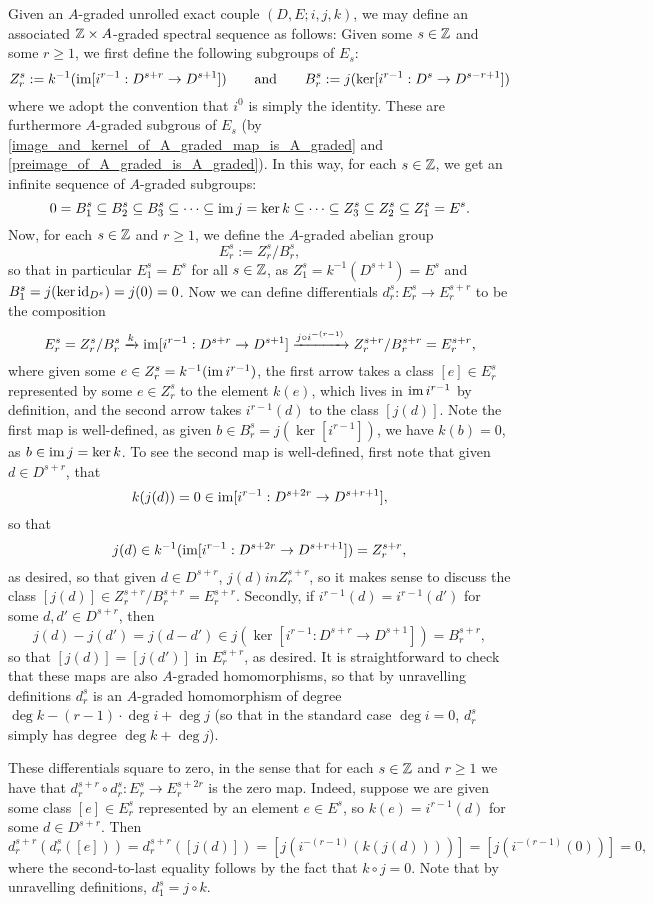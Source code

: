 \documentclass[../main.tex]{subfiles}
\begin{document}
Given an $A$-graded unrolled exact couple $(D,E;i,j,k)$, we may define an associated $\mathbb{Z}\times A$-graded spectral sequence as follows: Given some $s\in\mathbb{Z}$ and some $r\geq1$, we first define the following subgroups of $E_s$:
\[Z_r^s:= k^{-1}(\operatorname{im}[i^{r-1}:D^{s+r}\to D^{s+1}])\qquad\text{and}\qquad B_r^s:=j(\ker[i^{r-1}:D^s\to D^{s-r+1}])\]
where we adopt the convention that $i^{0}$ is simply the identity. These are furthermore $A$-graded subgrous of $E_s$ (by \autoref{image_and_kernel_of_A_graded_map_is_A_graded} and \autoref{preimage_of_A_graded_is_A_graded}). In this way, for each $s\in\mathbb{Z}$, we get an infinite sequence of $A$-graded subgroups:
\[0=B_1^s\subseteq B_2^s\subseteq B_3^s\subseteq\cdots\subseteq\operatorname{im} j=\ker k\subseteq\cdots\subseteq Z_3^s\subseteq Z_2^s\subseteq Z_1^s=E^s.\]
Now, for each $s\in\mathbb{Z}$ and $r\geq1$, we define the $A$-graded abelian group
\[E^s_r:=Z^s_r/B^s_r,\]
so that in particular $E^s_1=E^s$ for all $s\in\mathbb{Z}$, as $Z_1^s=k^{-1}(D^{s+1})=E^s$ and $B_1^s=j(\ker \mathrm{id}_{D^s})=j(0)=0$. Now we can define differentials $d_r^s:E_r^s\to E_r^{s+r}$ to be the composition
\[E_r^s=Z_r^s/B_r^s\xrightarrow k\operatorname{im}[i^{r-1}:D^{s+r}\to D^{s+1}]\xrightarrow{j\circ i^{-(r-1)}}Z^{s+r}_r/B^{s+r}_r=E_r^{s+r},\]
where given some $e\in Z^s_r=k^{-1}(\operatorname{im} i^{r-1})$, the first arrow takes a class $[e]\in E^s_r$ represented by some $e\in Z^s_r$ to the element $k(e)$, which lives in $\operatorname{im} i^{r-1}$ by definition, and the second arrow takes $i^{r-1}(d)$ to the class $[j(d)]$. Note the first map is well-defined, as given $b\in B^s_r=j(\ker[i^{r-1}])$, we have $k(b)=0$, as $b\in\operatorname{im} j=\ker k$. To see the second map is well-defined, first note that given $d\in D^{s+r}$, that 
\[k(j(d))=0\in\operatorname{im}[i^{r-1}:D^{s+2r}\to D^{s+r+1}],\] 
so that 
\[j(d)\in k^{-1}(\operatorname{im}[i^{r-1}:D^{s+2r}\to D^{s+r+1}])= Z^{s+r}_r,\] 
as desired, so that given $d\in D^{s+r}$, $j(d)in Z_r^{s+r}$, so it makes sense to discuss the class $[j(d)]\in Z_r^{s+r}/B_r^{s+r}=E_r^{s+r}$. Secondly, if $i^{r-1}(d)=i^{r-1}(d')$ for some $d,d'\in D^{s+r}$, then
\[j(d)-j(d')=j(d-d')\in j(\ker[i^{r-1}:D^{s+r}\to D^{s+1}])=B^{s+r}_r,\]
so that $[j(d)]=[j(d')]$ in $E_r^{s+r}$, as desired. It is straightforward to check that these maps are also $A$-graded homomorphisms, so that by unravelling definitions $d_r^s$ is an $A$-graded homomorphism of degree $\deg k-(r-1)\cdot\deg i+\deg j$ (so that in the standard case $\deg i=0$, $d_r^s$ simply has degree $\deg k+\deg j$).

These differentials square to zero, in the sense that for each $s\in\mathbb{Z}$ and $r\geq1$ we have that $d_r^{s+r}\circ d_r^s:E^s_r\to E_r^{s+2r}$ is the zero map. Indeed, suppose we are given some class $[e]\in E^s_r$ represented by an element $e\in E^s$, so $k(e)=i^{r-1}(d)$ for some $d\in D^{s+r}$. Then 
\[d_r^{s+r}(d_r^s([e]))=d_r^{s+r}([j(d)])=[j(i^{-(r-1)}(k(j(d))))]=[j(i^{-(r-1)}(0))]=0,\]
where the second-to-last equality follows by the fact that $k\circ j=0$. Note that by unravelling definitions, $d_1^s=j\circ k$.
\end{document}
